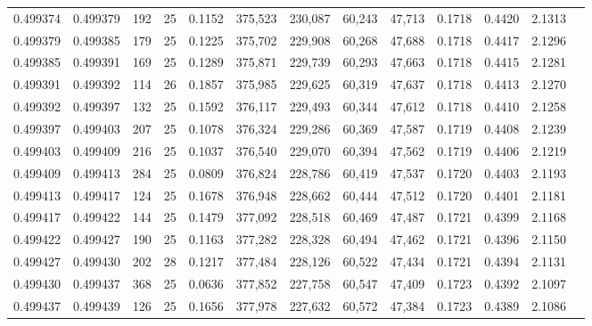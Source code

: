\begin{tabular}{rrrrrrrrrrrrr}
0.499374 & 0.499379 & 192 &  25 &                                     0.1152 & 375,523 & 230,087 &  60,243 &  47,713 & 0.1718 & 0.4420 & 2.1313 \\
0.499379 & 0.499385 & 179 &  25 &                                     0.1225 & 375,702 & 229,908 &  60,268 &  47,688 & 0.1718 & 0.4417 & 2.1296 \\
0.499385 & 0.499391 & 169 &  25 &                                     0.1289 & 375,871 & 229,739 &  60,293 &  47,663 & 0.1718 & 0.4415 & 2.1281 \\
0.499391 & 0.499392 & 114 &  26 &                                     0.1857 & 375,985 & 229,625 &  60,319 &  47,637 & 0.1718 & 0.4413 & 2.1270 \\
0.499392 & 0.499397 & 132 &  25 &                                     0.1592 & 376,117 & 229,493 &  60,344 &  47,612 & 0.1718 & 0.4410 & 2.1258 \\
0.499397 & 0.499403 & 207 &  25 &                                     0.1078 & 376,324 & 229,286 &  60,369 &  47,587 & 0.1719 & 0.4408 & 2.1239 \\
0.499403 & 0.499409 & 216 &  25 &                                     0.1037 & 376,540 & 229,070 &  60,394 &  47,562 & 0.1719 & 0.4406 & 2.1219 \\
0.499409 & 0.499413 & 284 &  25 &                                     0.0809 & 376,824 & 228,786 &  60,419 &  47,537 & 0.1720 & 0.4403 & 2.1193 \\
0.499413 & 0.499417 & 124 &  25 &                                     0.1678 & 376,948 & 228,662 &  60,444 &  47,512 & 0.1720 & 0.4401 & 2.1181 \\
0.499417 & 0.499422 & 144 &  25 &                                     0.1479 & 377,092 & 228,518 &  60,469 &  47,487 & 0.1721 & 0.4399 & 2.1168 \\
0.499422 & 0.499427 & 190 &  25 &                                     0.1163 & 377,282 & 228,328 &  60,494 &  47,462 & 0.1721 & 0.4396 & 2.1150 \\
0.499427 & 0.499430 & 202 &  28 &                                     0.1217 & 377,484 & 228,126 &  60,522 &  47,434 & 0.1721 & 0.4394 & 2.1131 \\
0.499430 & 0.499437 & 368 &  25 &                                     0.0636 & 377,852 & 227,758 &  60,547 &  47,409 & 0.1723 & 0.4392 & 2.1097 \\
0.499437 & 0.499439 & 126 &  25 &                                     0.1656 & 377,978 & 227,632 &  60,572 &  47,384 & 0.1723 & 0.4389 & 2.1086 \\

\end{tabular}
